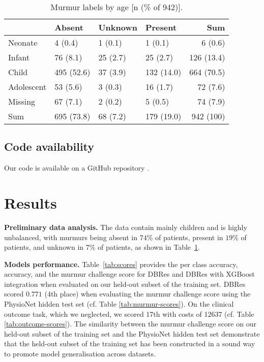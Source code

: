 \documentclass[twocolumn]{cinc}
\begin{document}
\begin{table}[htbp]
\caption{Murmur labels by age [n (\% of 942)].}
\smallskip
\label{tab:murmur_outcome}
\small\renewcommand{\arraystretch}{1.2}
\begin{tabular}{llllr} \hline
            &Absent        &Unknown       &Present       &Sum \\
            \hline\hline
Neonate     & 4 (0.4)       & 1 (0.1)       & 1 (0.1)       & 6 (0.6) \\
Infant      & 76 (8.1)      & 25 (2.7)      & 25 (2.7)      & 126 (13.4) \\
Child       & 495 (52.6)    & 37 (3.9)      & 132 (14.0)    & 664 (70.5) \\
Adolescent  & 53 (5.6)      & 3 (0.3)       & 16 (1.7)      & 72 (7.6) \\
Missing     & 67 (7.1)      & 2 (0.2)       & 5 (0.5)       & 74 (7.9) \\
\hline\hline
Sum        & 695 (73.8)    & 68 (7.2)      & 179 (19.0)    & 942 (100) \\\hline
\bottomrule
\end{tabular}
\end{table}

\subsection{Code availability}
Our code is available on a GitHub repository \cite{Walker22}.

\section{Results}
{\bf Preliminary data analysis.} The data contain mainly children and is highly unbalanced, with murmurs being absent in $74\%$ of patients, present in $19\%$ of patients, and unknown in $7\%$ of patients, as shown in Table~\ref{tab:murmur_outcome}. 



{\bf Models performance.} Table~\ref{tab:scores} provides the per class accuracy, accuracy, and the murmur challenge score for DBRes and DBRes with XGBoost integration when evaluated on our held-out subset of the training set. DBRes scored $0.771$ (4th place) when evaluating the murmur challenge score using the PhysioNet hidden test set (cf. Table \ref{tab:murmur-scores}). On the clinical outcome task, which we neglected, we scored 17th with costs of 12637 (cf. Table \ref{tab:outcome-scores}). The similarity between the murmur challenge score on our held-out subset of the training set and the PhysioNet hidden test set demonstrate that the held-out subset of the training set has been constructed in a sound way to promote model generalisation across datasets.
\end{document}
